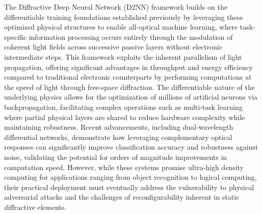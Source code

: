 \documentclass[11pt]{article}
\begin{document}
The Diffractive Deep Neural Network (D2NN) framework builds on the differentiable training foundations established previously by leveraging these optimized physical structures to enable all-optical machine learning, where task-specific information processing occurs entirely through the modulation of coherent light fields across successive passive layers without electronic intermediate steps. This framework exploits the inherent parallelism of light propagation, offering significant advantages in throughput and energy efficiency compared to traditional electronic counterparts by performing computations at the speed of light through free-space diffraction. The differentiable nature of the underlying physics allows for the optimization of millions of artificial neurons via backpropagation, facilitating complex operations such as multi-task learning where partial physical layers are shared to reduce hardware complexity while maintaining robustness. Recent advancements, including dual-wavelength differential networks, demonstrate how leveraging complementary optical responses can significantly improve classification accuracy and robustness against noise, validating the potential for orders of magnitude improvements in computation speed. However, while these systems promise ultra-high density computing for applications ranging from object recognition to logical computing, their practical deployment must eventually address the vulnerability to physical adversarial attacks and the challenges of reconfigurability inherent in static diffractive elements. \citep{doi_10_1515_nanoph_2023_0760_2c3ec088} \citep{s2_88f87b34acdb11cf20ad16d6fbdd5399e8617f8f_a548a720} \citep{doi_10_1002_lpor_202500433_c50e8d3b} \citep{doi_10_1109_dac18074_2021_9586204_0c48190f}
\end{document}

